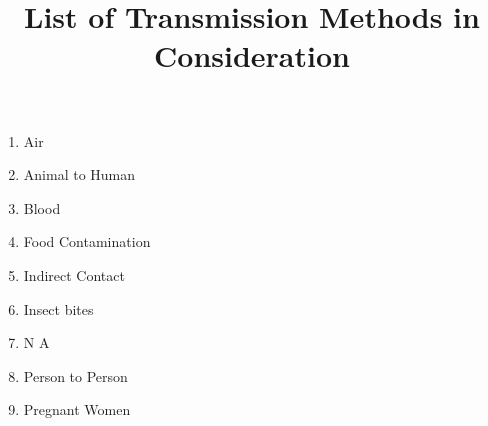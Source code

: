 \documentclass{article}
\title{List of Transmission Methods in Consideration}
\date{}
\begin{document}
\maketitle
\begin{multicols}{1}
    \begin{enumerate}
      \item Air
      \item Animal to Human
      \item Blood
      \item Food Contamination
      \item Indirect Contact
      \item Insect bites
      \item N A
      \item Person to Person
      \item Pregnant Women
    \end{enumerate}
  \end{multicols}
\end{document}
